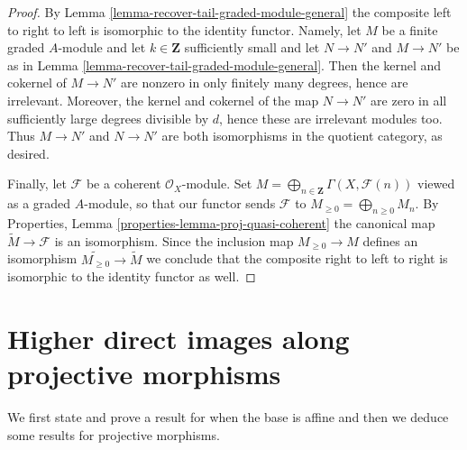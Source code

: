 \documentclass{stacks-project}
\theoremstyle{plain}
\theoremstyle{definition}
\theoremstyle{remark}
\numberwithin{equation}{subsection}
\begin{document}
\begin{proof}
\medskip\noindent
By Lemma \ref{lemma-recover-tail-graded-module-general}
the composite left to right to left is isomorphic to the identity functor.
Namely, let $M$ be a finite graded $A$-module and let
$k \in \mathbf{Z}$ sufficiently small and let
$N \to N'$ and $M \to N'$ be as in
Lemma \ref{lemma-recover-tail-graded-module-general}.
Then the kernel and cokernel of $M \to N'$ are nonzero in
only finitely many degrees, hence are irrelevant. Moreover, the
kernel and cokernel of the map $N \to N'$ are zero in all sufficiently
large degrees divisible by $d$, hence these are irrelevant modules too.
Thus $M \to N'$ and $N \to N'$ are both isomorphisms in the quotient
category, as desired.

\medskip\noindent
Finally, let $\mathcal{F}$ be a coherent $\mathcal{O}_X$-module.
Set $M = \bigoplus_{n \in \mathbf{Z}} \Gamma(X, \mathcal{F}(n))$
viewed as a graded $A$-module, so that our functor sends $\mathcal{F}$ to
$M_{\geq 0} = \bigoplus_{n \geq 0} M_n$.
By Properties, Lemma \ref{properties-lemma-proj-quasi-coherent}
the canonical map $\widetilde M \to \mathcal{F}$
is an isomorphism. Since the inclusion map
$M_{\geq 0} \to M$ defines an isomorphism
$\widetilde{M_{\geq 0}} \to \widetilde M$ we conclude that
the composite right to left to right is isomorphic to the identity
functor as well.
\end{proof}










\section{Higher direct images along projective morphisms}
\label{section-projective-pushforward}

\noindent
We first state and prove a result for when the base is affine
and then we deduce some results for projective morphisms.
\end{document}
